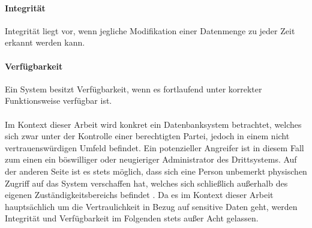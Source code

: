 \paragraph{Integrität}
Integrität liegt vor, wenn jegliche Modifikation einer Datenmenge zu jeder Zeit erkannt werden kann.

\paragraph{Verfügbarkeit}
Ein System besitzt Verfügbarkeit, wenn es fortlaufend unter korrekter Funktionsweise verfügbar ist.

\paragraph{}
Im Kontext dieser Arbeit wird konkret ein Datenbanksystem betrachtet, welches sich zwar unter der Kontrolle einer berechtigten Partei, jedoch in einem nicht vertrauenswürdigen Umfeld befindet. Ein potenzieller Angreifer ist in diesem Fall zum einen ein böswilliger oder neugieriger Administrator des Drittsystems. Auf der anderen Seite ist es stets möglich, dass sich eine Person unbemerkt physischen Zugriff auf das System verschaffen hat, welches sich schließlich außerhalb des eigenen Zuständigkeitsbereichs befindet \cite{Popa2012}. Da es im Kontext dieser Arbeit hauptsächlich um die Vertraulichkeit in Bezug auf sensitive Daten geht, werden Integrität und Verfügbarkeit im Folgenden stets außer Acht gelassen. 

